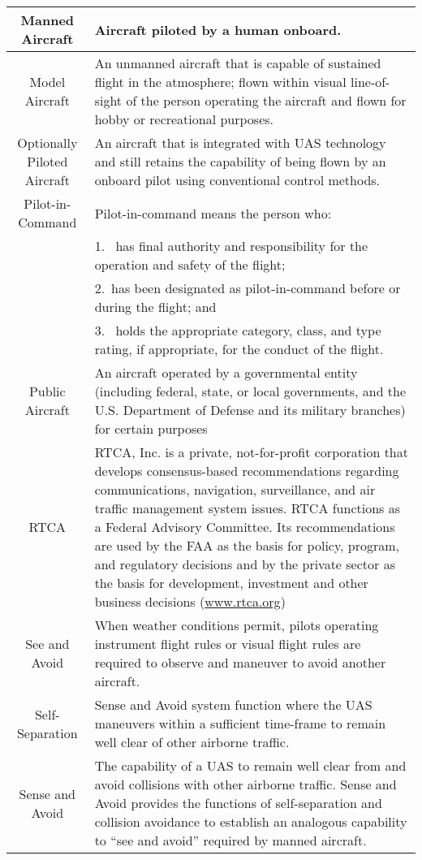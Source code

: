 \begin{tabularx}{\textwidth}{S{0.22}|X}
     Manned Aircraft & Aircraft piloted by a human onboard.\\\hline
     Model Aircraft & An unmanned aircraft that is capable of sustained flight in the atmosphere; flown within visual line-of-sight of the person operating the aircraft and flown for hobby or recreational purposes.\\\hline
     Optionally Piloted Aircraft & An aircraft that is integrated with UAS technology and still retains the capability of being flown by an onboard pilot using conventional control methods.\\\hline
     Pilot-in-Command & Pilot-in-command means the person who:\\
     &1.~ has final authority and responsibility for the operation and safety of the flight;\\
     &2.~has been designated as pilot-in-command before or during the flight; and\\
     &3.~ holds the appropriate category, class, and type rating, if appropriate, for the conduct of the flight.\\\hline
     Public Aircraft & An aircraft operated by a governmental entity (including federal, state, or local governments, and the U.S. Department of Defense and its military branches) for certain purposes\\\hline 
     RTCA & RTCA, Inc. is a private, not-for-profit corporation that develops consensus-based recommendations regarding communications, navigation, surveillance, and air traffic management system issues. RTCA functions as a Federal Advisory Committee. Its recommendations are used by the FAA as the basis for policy, program, and regulatory decisions and by the private sector as the basis for development, investment and other business decisions  (\url{www.rtca.org})\\\hline
     See and Avoid & When weather conditions permit, pilots operating instrument flight rules or visual flight rules are required to observe and maneuver to avoid another aircraft. \\\hline
     Self-Separation & Sense and Avoid system function where the UAS maneuvers within a sufficient time-frame to remain well clear of other airborne traffic.\\\hline 
     Sense and Avoid & The capability of a UAS to remain well clear from and avoid collisions with other airborne traffic. Sense and Avoid provides the functions of self-separation and collision avoidance to establish an analogous capability to “see and avoid” required by manned aircraft.\\\hline

\end{tabularx}
